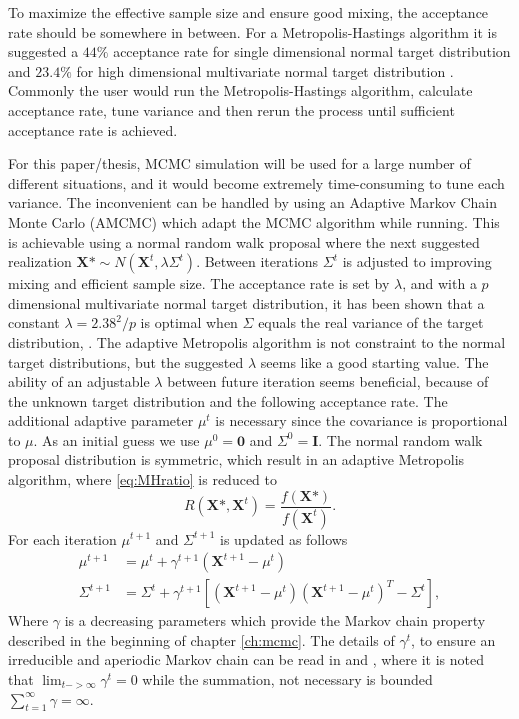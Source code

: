 To maximize the effective sample size and ensure good mixing, the acceptance rate should be somewhere in between. For a Metropolis-Hastings algorithm it is suggested a $44\%$ acceptance rate for single dimensional normal target distribution and $23.4\%$ for high dimensional multivariate normal target distribution \cite{AccRate}.%
Commonly the user would run the Metropolis-Hastings algorithm, calculate acceptance rate, tune variance and then rerun the process until sufficient acceptance rate is achieved. 

For this paper/thesis, MCMC simulation will be used for a large number of different situations, and it would become extremely time-consuming to tune each variance. 
The inconvenient can be handled by using an Adaptive Markov Chain Monte Carlo (AMCMC) which adapt the MCMC algorithm while running. This is achievable using a normal random walk proposal where the next suggested realization $ \boldsymbol{X}\mbox{*} \sim N ( \boldsymbol{X}^{t}, \lambda \Sigma^{t})$. 
Between iterations $\Sigma^t$ is adjusted to improving mixing and efficient sample size. The acceptance rate is set by $\lambda$, and with a $p$ dimensional multivariate normal target distribution, it has been shown that a constant $\lambda=2.38^2/p$ is optimal when $\Sigma$ equals the real variance of the target distribution, \cite{AccRate}. The adaptive Metropolis algorithm is not constraint to the normal target distributions, but the suggested $\lambda$ seems like a good starting value. The ability of an adjustable $\lambda$ between future iteration seems beneficial, because of the unknown target distribution and the following acceptance rate.
The additional adaptive parameter $\mu^t$ is necessary since the covariance is proportional to $\mu$. As an initial guess we use $\mu^0=\boldsymbol{0}$ and $\Sigma^0=\mathbf{I}$.
The normal random walk proposal distribution is symmetric, which result in an adaptive Metropolis algorithm, where \eqref{eq:MHratio} is reduced to
\begin{equation}
\label{eq:metropolis}
R(\boldsymbol{X} \mbox{*},\boldsymbol{X}^{t})=\frac{f(\boldsymbol{X} \mbox{*})}{f(\boldsymbol{X}^{t})}.
\end{equation}
For each iteration $\mu^{t+1}$ and $\Sigma^{t+1}$ is updated as follows
\begin{align}
\mu^{t+1}&=\mu^{t}+\gamma^{t+1}(\boldsymbol{X}^{t+1}-\mu^t)\\
\Sigma^{t+1}&=\Sigma^{t}+\gamma^{t+1}[(\boldsymbol{X}^{t+1}-\mu^t)(\boldsymbol{X}^{t+1}-\mu^t)^{T}-\Sigma^{t}],
\end{align}
Where $\gamma$ is a decreasing parameters which provide the Markov chain property described in the beginning of chapter \ref{ch:mcmc}. The details of $\gamma^t$, to ensure an irreducible and aperiodic Markov chain can be read in \cite{550 compstat} and \cite{16 compstat}, where it is noted that $\lim_{t->\infty} \gamma^{t}=0$ while the summation, not necessary is bounded $ \sum_{t=1}^{\infty} \gamma=\infty $.


